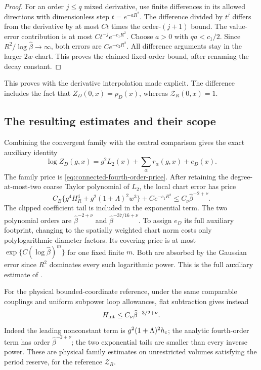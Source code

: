 \documentclass[11pt,reqno]{amsart}
\numberwithin{equation}{section}
\theoremstyle{definition}
\theoremstyle{remark}
\begin{document}
\begin{proof}
For an order \(j\le q\) mixed derivative,
use finite differences in its allowed
directions with dimensionless step
\(t=e^{-aR^2}\).
The difference divided by \(t^j\)
differs from the derivative by at most
\(Ct\) times the order-\((j+1)\)
bound. The value-error contribution
is at most \(Ct^{-j}e^{-c_1R^2}\).
Choose \(a>0\) with \(qa<c_1/2\).
Since \(R^2/\log\widehat\beta\to\infty\),
both errors are \(Ce^{-c_2R^2}\).
All difference arguments stay in
the larger \(2w\)-chart.
This proves the claimed fixed-order
bound, after renaming the decay
constant.
\end{proof}

This proves \cite[Lemma~24.5,
p.~124]{Main} with the derivative
interpolation made explicit.
The difference includes the fact
that \(Z_D(0,x)=p_D(x)\), whereas
\(\mathcal Z_R(0,x)=1\).

\subsection{The resulting estimates and their scope}

Combining the convergent family with
the central comparison gives the
exact auxiliary identity
\begin{equation}
             \log Z_D(g,x)
                    =g^2L_2(x)+\sum_\alpha r_\alpha(g,x)+e_D(x).
 \label{eq:connected-original-central-identity}
\end{equation}
The family price is
\eqref{eq:connected-fourth-order-price}.
After retaining the degree-at-most-two
coarse Taylor polynomial of \(L_2\),
the local chart error has price
\begin{equation}
 C_B\{g^4H_R^4+g^2(1+\Lambda)^2w^3\}
                      +Ce^{-c_1R^2}
                     \le C_\nu\widehat\beta^{-2+\nu}.
 \label{eq:connected-original-central-rate}
\end{equation}
The clipped coefficient tail is
included in the exponential term.
The two polynomial orders are
\(\widehat\beta^{-2+\nu}\) and
\(\widehat\beta^{-37/16+\nu}\).
To assign \(e_D\) its full auxiliary
footprint, changing to the spatially
weighted chart norm costs only
polylogarithmic diameter factors.
Its covering price is at most
\(\exp\{C(\log\widehat\beta)^m\}\)
for one fixed finite \(m\).
Both are absorbed by the Gaussian
error since \(R^2\) dominates every
such logarithmic power.
This is the full auxiliary estimate
of \cite[Corollary~24.6,
p.~125]{Main}.

For the physical bounded-coordinate
reference, under the same comparable
couplings and uniform subpower loop
allowances, flat subtraction gives
instead
\begin{equation}
                         H_{\rm int}
                            \le C_\nu\widehat\beta^{-3/2+\nu}.
 \label{eq:connected-physical-final-rate}
\end{equation}
Indeed the leading nonconstant term
is \(g^2(1+\Lambda)^2h_{\rm c}\);
the analytic fourth-order term has
order \(\widehat\beta^{-2+\nu}\);
the two exponential tails are
smaller than every inverse power.
These are physical family estimates
on unrestricted volumes satisfying
the period reserve, for the reference
\(\mathcal Z_R\).
\end{document}
